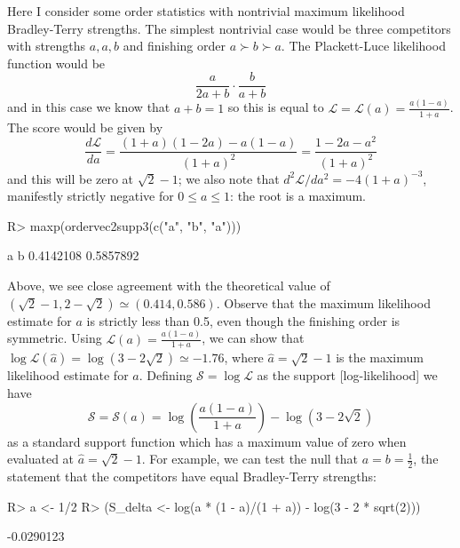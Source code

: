 \documentclass[article]{jss}
\begin{document}
Here I consider some order statistics with nontrivial maximum
likelihood Bradley-Terry strengths.  The simplest nontrivial case
would be three competitors with strengths $a,a,b$ and finishing order
$a\succ b\succ a$.  The Plackett-Luce likelihood function would be
%
\begin{equation}\label{aba}
\frac{a}{2a+b}\cdot\frac{b}{a+b}
\end{equation}
%
and in this case we know that $a+b=1$ so this is equal to
$\mathcal{L}=\mathcal{L}(a)=\frac{a(1-a)}{1+a}$.  The score would be
given by
%
\begin{equation}\label{aba_mle}
\frac{d\mathcal{L}}{da}=\frac{(1+a)(1-2a)-a(1-a)}{(1+a)^2}=
\frac{1-2a-a^2}{(1+a)^2}
\end{equation}
%
and this will be zero at $\sqrt{2}-1$; we also note that
$d^2\mathcal{L}/da^2=-4(1+a)^{-3}$, manifestly strictly negative for
$0\leq a\leq 1$: the root is a maximum.
%
\begin{Schunk}
\begin{Sinput}
R> maxp(ordervec2supp3(c("a", "b", "a")))
\end{Sinput}
\begin{Soutput}
        a         b 
0.4142108 0.5857892 
\end{Soutput}
\end{Schunk}
%
Above, we see close agreement with the theoretical value of
$(\sqrt{2}-1,2-\sqrt{2})\simeq (0.414,0.586)$.  Observe that the
maximum likelihood estimate for $a$ is strictly less than 0.5, even
though the finishing order is symmetric.  Using
$\mathcal{L}(a)=\frac{a(1-a)}{1+a}$, we can show that
$\log\mathcal{L}(\hat{a})=\log\left(3-2\sqrt{2}\right)\simeq -1.76$,
where $\hat{a}=\sqrt{2}-1$ is the maximum likelihood estimate for $a$.
Defining $\mathcal{S}=\log\mathcal{L}$ as the support [log-likelihood]
we have
%
\begin{equation}
\mathcal{S}=\mathcal{S}(a)=\log\left(\frac{a(1-a)}{1+a}\right)-\log\left(3-2\sqrt{2}\right)
\end{equation}
%
as a standard support function which has a maximum value of zero when
evaluated at $\hat{a}=\sqrt{2}-1$.  For example, we can test the null
that $a=b=\frac{1}{2}$, the statement that the competitors have equal
Bradley-Terry strengths:
%
\begin{Schunk}
\begin{Sinput}
R> a <- 1/2
R> (S_delta <- log(a * (1 - a)/(1 + a)) - log(3 - 2 * sqrt(2)))
\end{Sinput}
\begin{Soutput}
[1] -0.0290123
\end{Soutput}
\end{Schunk}
\end{document}
